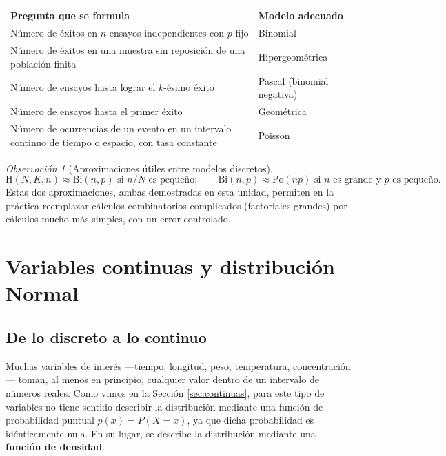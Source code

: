 \documentclass[11pt,a4paper]{article}
\theoremstyle{plain}
\theoremstyle{definition}
\theoremstyle{remark}
\newtheorem{observacion}[teorema]{Observación}
\begin{document}
\begin{center}
\small
\begin{tabular}{p{5.2cm}p{6.5cm}}
\toprule
\textbf{Pregunta que se formula} & \textbf{Modelo adecuado} \\
\midrule
Número de éxitos en $n$ ensayos independientes con $p$ fijo & Binomial \\
Número de éxitos en una muestra sin reposición de una población finita & Hipergeométrica \\
Número de ensayos hasta lograr el $k$-ésimo éxito & Pascal (binomial negativa) \\
Número de ensayos hasta el primer éxito & Geométrica \\
Número de ocurrencias de un evento en un intervalo continuo de tiempo o espacio, con tasa constante & Poisson \\
\bottomrule
\end{tabular}
\end{center}

\begin{observacion}[Aproximaciones útiles entre modelos discretos]
$$\text{H}(N,K,n)\approx\text{Bi}(n,p) \text{ si } n/N \text{ es pequeño}; \qquad \text{Bi}(n,p)\approx\text{Po}(np) \text{ si } n \text{ es grande y } p \text{ es pequeño}.$$
Estas dos aproximaciones, ambas demostradas en esta unidad, permiten en la práctica reemplazar cálculos combinatorios complicados (factoriales grandes) por cálculos mucho más simples, con un error controlado.
\end{observacion}

\newpage
\section{Variables continuas y distribución Normal}

\subsection{De lo discreto a lo continuo}

Muchas variables de interés —tiempo, longitud, peso, temperatura, concentración— toman, al menos en principio, cualquier valor dentro de un intervalo de números reales. Como vimos en la Sección \ref{sec:continuas}, para este tipo de variables no tiene sentido describir la distribución mediante una función de probabilidad puntual $p(x)=P(X=x)$, ya que dicha probabilidad es idénticamente nula. En su lugar, se describe la distribución mediante una \textbf{función de densidad}.
\end{document}

